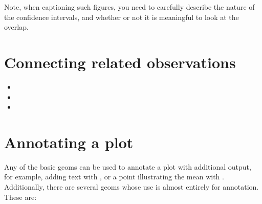 % 


% 
% 


Note, when captioning such figures, you need to carefully describe the nature of the confidence intervals, and whether or not it is meaningful to look at the overlap.  



\section{Connecting related observations}
\label{sec:connecting}

\begin{itemize}
  \item {}
  \item {}
  \item {}
\end{itemize}

\section{Annotating a plot}
\label{sec:annotating}

Any of the basic geoms can be used to annotate a plot with additional output, for example, adding text with , or a point illustrating the mean with .  Additionally, there are several geoms whose use is almost entirely for annotation.  These are:

